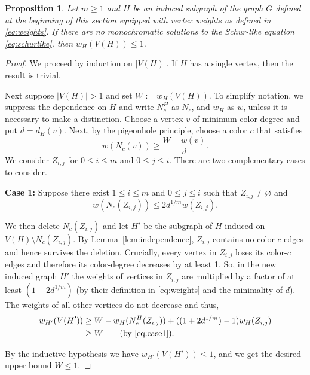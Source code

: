 \documentclass[11pt]{article}
\theoremstyle{plain}
\newtheorem{proposition}[theorem]{Proposition}
\theoremstyle{definition}
\theoremstyle{definition}
\theoremstyle{remark}
\begin{document}
\begin{proposition} \label{prop:weight_le1}
Let $m\geq 1$ and \(H\) be an induced subgraph of the graph $G$ defined at the beginning of this section equipped with vertex weights as defined in \eqref{eq:weights}. If there are no monochromatic solutions to the Schur-like equation \eqref{eq:schurlike}, then \(w_{H}(V(H))\leq 1\).
\end{proposition} 

\begin{proof} 
We proceed by induction on \(|V(H)|\). If \(H\) has a single vertex, then the result is trivial.

Next suppose \(|V(H)|>1\) and set \(W:=w_{H}(V(H))\). To simplify notation, we suppress the dependence on $H$ and write $N_c^{H}$ as $N_c$, and $w_H$ as $w$, unless it is necessary to make a distinction. Choose a vertex \(v\) of minimum color-degree and put \(d=d_{H}(v)\). Next, by the pigeonhole principle, choose a color \(c\) that satisfies
\[
 w(N_{c}(v)) \geq \frac{W-w(v)}{d}.
 \] 
 We consider \(Z_{i,j}\) for \(0\leq i\leq m\) and \(0\leq j \leq i\). There are two complementary cases to consider.

\textbf{Case 1:} Suppose there exist \(1\leq i \leq m\) and \(0\leq j\leq i\) such that \(Z_{i,j}\neq\varnothing\) and 
\begin{equation} \label{eq:case1}
     w(N_{c}(Z_{i,j})) \leq 2 d^{1/m}w(Z_{i,j}). 
\end{equation}

We then delete \(N_{c}(Z_{i,j})\) and let \(H'\) be the subgraph of
\(H\) induced on \(V(H)\setminus N_{c}(Z_{i,j})\). By Lemma~\ref{lem:independence}, \(Z_{i,j}\) contains no color-\(c\) edges and hence survives the deletion. Crucially, every vertex in \(Z_{i,j}\) loses its color-\(c\) edges and therefore its color-degree decreases by at least 1. So, in the new induced graph $H'$ the weights of vertices in \(Z_{i,j}\) are multiplied by a factor of at least \((1+ 2 d^{1/m})\) (by their definition in \eqref{eq:weights} and the minimality of \(d\)). The weights of all other vertices do not decrease and thus,
 \begin{align*}
 w_{H'}(V(H'))  & \geq W - w_{H}(N_{c}^{H}(Z_{i,j}))+ ((1+ 2 d^{1/m})-1)w_{H}(Z_{i,j}) \\
  & \geq W  \qquad (\text{by \eqref{eq:case1}}).
 \end{align*} 

By the inductive hypothesis we have $w_{H'}(V(H')) \le 1$, and we get the desired upper bound \(W\leq 1\).


\end{proof}
\end{document}
